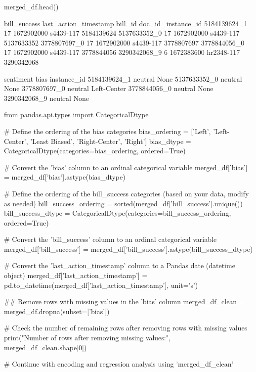 \begin{pyin}
merged_df.head()
\end{pyin}

\begin{pyprint}
              bill_success  last_action_timestamp     bill_id      doc_id  \
instance_id                                                                 
5184139624_1            17             1672902000   s4439-117  5184139624   
5137633352_0            17             1672902000   s4439-117  5137633352   
3778807697_0            17             1672902000   s4439-117  3778807697   
3778844056_0            17             1672902000   s4439-117  3778844056   
3290342068_9             6             1672383600  hr2348-117  3290342068   

             sentiment         bias  
instance_id                          
5184139624_1   neutral         None  
5137633352_0   neutral         None  
3778807697_0   neutral  Left-Center  
3778844056_0   neutral         None  
3290342068_9   neutral         None
\end{pyprint}

\begin{pyin}
from pandas.api.types import CategoricalDtype

# Define the ordering of the bias categories
bias_ordering = ['Left', 'Left-Center', 'Least Biased', 'Right-Center', 'Right']
bias_dtype = CategoricalDtype(categories=bias_ordering, ordered=True)

# Convert the 'bias' column to an ordinal categorical variable
merged_df['bias'] = merged_df['bias'].astype(bias_dtype)

# Define the ordering of the bill_success categories (based on your data, modify as needed)
bill_success_ordering = sorted(merged_df['bill_success'].unique())
bill_success_dtype = CategoricalDtype(categories=bill_success_ordering, ordered=True)

# Convert the 'bill_success' column to an ordinal categorical variable
merged_df['bill_success'] = merged_df['bill_success'].astype(bill_success_dtype)

# Convert the 'last_action_timestamp' column to a Pandas date (datetime object)
merged_df['last_action_timestamp'] = pd.to_datetime(merged_df['last_action_timestamp'], unit='s')
\end{pyin}

\begin{pyin}
\## Remove rows with missing values in the 'bias' column
merged_df_clean = merged_df.dropna(subset=['bias'])

# Check the number of remaining rows after removing rows with missing values
print("Number of rows after removing missing values:", merged_df_clean.shape[0])

# Continue with encoding and regression analysis using 'merged_df_clean'
\end{pyin}

